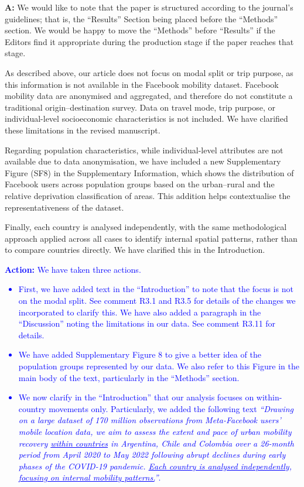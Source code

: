 \documentclass[12pt,a4paper,oneside, reqno]{amsart}
\begin{document}
\setlength{\leftskip}{1cm}\textbf{A:} We would like to note that the paper is structured according to the journal's guidelines; that is, the ``Results'' Section being placed before the ``Methods'' section.  We would be happy to move the ``Methods'' before ``Results'' if the Editors find it appropriate during the production stage if the paper reaches that stage.

As described above, our article does not focus on modal split or trip purpose, as this information is not available in the Facebook mobility dataset. Facebook mobility data are anonymised and aggregated, and therefore do not constitute a traditional origin–destination survey. Data on travel mode, trip purpose, or individual-level socioeconomic characteristics is not included. We have clarified these limitations in the revised manuscript.

Regarding population characteristics, while individual-level attributes are not available due to data anonymisation, we have included a new Supplementary Figure (SF8) in the Supplementary Information, which shows the distribution of Facebook users across population groups based on the urban–rural and the relative deprivation classification of areas. This addition helps contextualise the representativeness of the dataset.

Finally, each country is analysed independently, with the same methodological approach applied across all cases to identify internal spatial patterns, rather than to compare countries directly. We have clarified this in the Introduction.

\textcolor{blue}{
\textbf{Action:} We have taken three actions. \begin{itemize}[noitemsep, topsep=0pt]
    \item First, we have added text in the ``Introduction'' to note that the focus is not on the modal split. See comment R3.1 and R3.5 for details of the changes we incorporated to clarify this. We have also added a paragraph in the ``Discussion'' noting the limitations in our data. See comment R3.11 for details.
    \item We have added Supplementary Figure 8 to give a better idea of the population groups represented by our data. We also refer to this Figure in the main body of the text, particularly in the ``Methods'' section.
    \item We now clarify in the ``Introduction'' that our analysis focuses on within-country movements only. Particularly, we added the following text \textit{``Drawing on a large dataset of 170 million observations from Meta-Facebook users' mobile location data, we aim to assess the extent and pace of urban mobility recovery \uline{within countries} in Argentina, Chile and Colombia over a 26-month period from April 2020 to May 2022 following abrupt declines during early phases of the COVID-19 pandemic. \uline{Each country is analysed independently, focusing on internal mobility patterns.}''}.
\end{itemize}}
\end{document}
